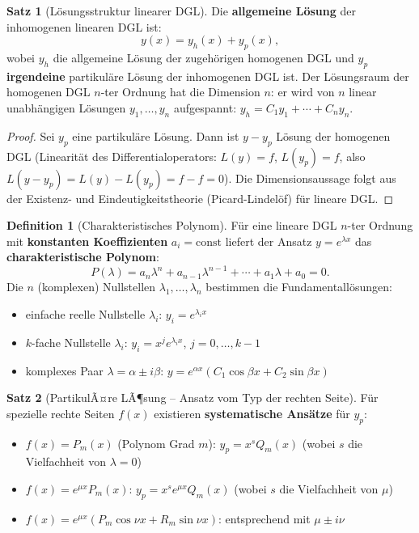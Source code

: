 ﻿\documentclass[a4paper,12pt]{report}
\theoremstyle{definition}
\newtheorem{definition}{Definition}
\newtheorem{satz}{Satz}
\begin{document}
\begin{satz}[L\"osungsstruktur linearer DGL]
Die \textbf{allgemeine L\"osung} der inhomogenen linearen DGL ist:
\[
  y(x) = y_h(x) + y_p(x),
\]
wobei $y_h$ die allgemeine L\"osung der zugeh\"origen homogenen DGL
und $y_p$ \textbf{irgendeine} partikul\"are L\"osung der inhomogenen DGL ist.
Der L\"osungsraum der homogenen DGL $n$-ter Ordnung hat die Dimension $n$:
er wird von $n$ linear unabh\"angigen L\"osungen $y_1, \ldots, y_n$ aufgespannt:
$y_h = C_1 y_1 + \cdots + C_n y_n$.
\end{satz}
\begin{proof}
Sei $y_p$ eine partikul\"are L\"osung. Dann ist $y - y_p$ L\"osung der
homogenen DGL (Linearit\"at des Differentialoperators: $L(y) = f$,
$L(y_p) = f$, also $L(y - y_p) = L(y) - L(y_p) = f - f = 0$).
Die Dimensionsaussage folgt aus der Existenz- und Eindeutigkeitstheorie
(Picard-Lindel\"of) f\"ur lineare DGL.
\end{proof}

\begin{definition}[Charakteristisches Polynom]
F\"ur eine lineare DGL $n$-ter Ordnung mit \textbf{konstanten Koeffizienten}
$a_i = \mathrm{const}$ liefert der Ansatz $y = e^{\lambda x}$
das \textbf{charakteristische Polynom}:
\[
  P(\lambda) = a_n\lambda^n + a_{n-1}\lambda^{n-1} + \cdots + a_1\lambda + a_0 = 0.
\]
Die $n$ (komplexen) Nullstellen $\lambda_1, \ldots, \lambda_n$ bestimmen die
Fundamentall\"osungen:
\begin{itemize}
    \item[-] einfache reelle Nullstelle $\lambda_i$: $y_i = e^{\lambda_i x}$
    \item[-] $k$-fache Nullstelle $\lambda_i$: $y_i = x^j e^{\lambda_i x}$, $j = 0, \ldots, k-1$
    \item[-] komplexes Paar $\lambda = \alpha \pm i\beta$: $y = e^{\alpha x}(C_1\cos\beta x + C_2\sin\beta x)$
\end{itemize}
\end{definition}

\begin{satz}[PartikulÃ¤re LÃ¶sung -- Ansatz vom Typ der rechten Seite]
F\"ur spezielle rechte Seiten $f(x)$ existieren \textbf{systematische Ans\"atze}
f\"ur $y_p$:
\begin{itemize}
    \item[-] $f(x) = P_m(x)$ (Polynom Grad $m$): $y_p = x^s Q_m(x)$ (wobei $s$ die Vielfachheit von $\lambda=0$)
    \item[-] $f(x) = e^{\mu x}P_m(x)$: $y_p = x^s e^{\mu x} Q_m(x)$ (wobei $s$ die Vielfachheit von $\mu$)
    \item[-] $f(x) = e^{\mu x}(P_m\cos\nu x + R_m\sin\nu x)$: entsprechend mit $\mu \pm i\nu$
\end{itemize}
\end{satz}
\end{document}
